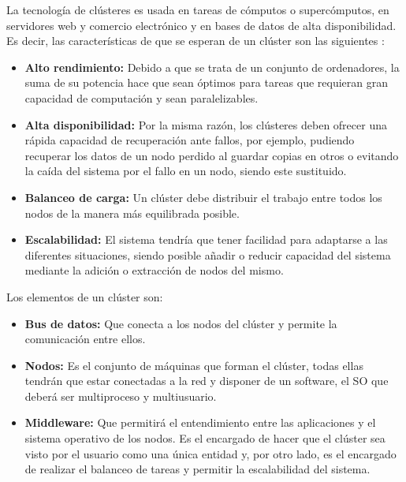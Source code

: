 La tecnología de clústeres es usada en tareas de cómputos o supercómputos, en servidores web y comercio electrónico y en bases de datos de alta disponibilidad. Es decir, las características de que se esperan de un clúster son las siguientes \cite{cluster}:

\begin{itemize}
	\item \textbf{Alto rendimiento:} Debido a que se trata de un conjunto de ordenadores, la suma de su potencia hace que sean óptimos para tareas que requieran gran capacidad de computación y sean paralelizables. 
	
	\item \textbf{Alta disponibilidad:} Por la misma razón, los clústeres deben ofrecer una rápida capacidad de recuperación ante fallos, por ejemplo, pudiendo recuperar los datos de un nodo perdido al guardar copias en otros o evitando la caída del sistema por el fallo en un nodo, siendo este sustituido.
	
	\item \textbf{Balanceo de carga:} Un clúster debe distribuir el trabajo entre todos los nodos de la manera más equilibrada posible.
	
	\item \textbf{Escalabilidad:} El sistema tendría que tener facilidad para adaptarse a las diferentes situaciones, siendo posible añadir o reducir capacidad del sistema mediante la adición o extracción de nodos del mismo.
\end{itemize}

Los elementos de un clúster son:

\begin{itemize}
	\item \textbf{Bus de datos:} Que conecta a los nodos del clúster y permite la comunicación entre ellos.
	
	\item \textbf{Nodos:} Es el conjunto de máquinas que forman el clúster, todas ellas tendrán que estar conectadas a la red y disponer de un software, el \gls{SO} que deberá ser multiproceso y multiusuario.
	
	\item \textbf{Middleware:} Que permitirá el entendimiento entre las aplicaciones y el sistema operativo de los nodos. Es el encargado de hacer que el clúster sea visto por el usuario como una única entidad y, por otro lado, es el encargado de realizar el balanceo de tareas y permitir la escalabilidad del sistema.
\end{itemize}


